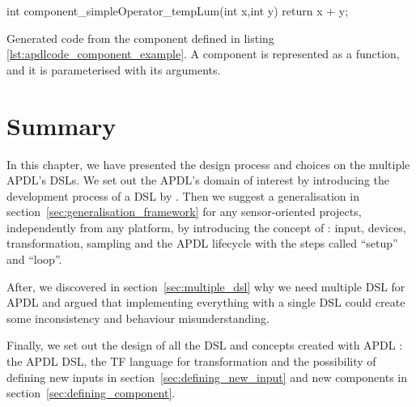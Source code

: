 \begin{listing}[H]
  \centering
\begin{cppcode}
int component_simpleOperator_tempLum(int x,int y) {
  return x + y;
}
\end{cppcode}
  \caption[Generated code for an \gls{APDL}'s component]{Generated code from the
component defined in listing \ref{lst:apdlcode_component_example}. A component is
represented as a function, and it is parameterised with its arguments.}
  \label{lst:component_generated}
\end{listing}

\section{Summary}
\label{sec:design_summary}

In this chapter, we have presented the design process and choices on the multiple
\gls{APDL}'s \gls{DSL}s. We set out the \gls{APDL}'s domain of interest by
introducing the development process of a \gls{DSL} by
\cite{little_languages_little_maintenance}. Then we suggest a
generalisation in section~\ref{sec:generalisation_framework} for any sensor-oriented
projects, independently from any platform, by introducing the concept of : input, devices,
transformation, sampling and the \gls{APDL} lifecycle with the steps called
``setup'' and ``loop''.

After, we discovered in section~\ref{sec:multiple_dsl} why we need multiple \gls{DSL} for \gls{APDL} and argued that
implementing everything with a single \gls{DSL} could create some inconsistency
and behaviour misunderstanding.

Finally, we set out the design of all the \gls{DSL} and concepts created with
\gls{APDL} : the \gls{APDL} \gls{DSL}, the \gls{TF}
language for transformation and the possibility of defining new
inputs in section~\ref{sec:defining_new_input} and new
components in section~\ref{sec:defining_component}.

